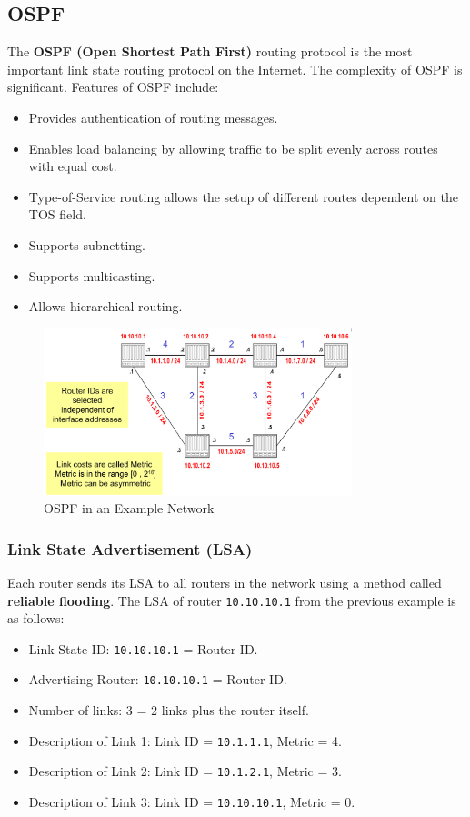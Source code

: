 \documentclass[a4paper,11pt]{article}
\begin{document}
\subsection{OSPF}
The \textbf{OSPF (Open Shortest Path First)} routing protocol is the most important link state routing protocol on 
the Internet. 
The complexity of OSPF is significant.
Features of OSPF include:
\begin{itemize}
    \item   Provides authentication of routing messages.
    \item   Enables load balancing by allowing traffic to be split evenly across routes with equal cost.
    \item   Type-of-Service routing allows the setup of different routes dependent on the TOS field.
    \item   Supports subnetting.
    \item   Supports multicasting.
    \item   Allows hierarchical routing.
\end{itemize}

\begin{figure}[H]
    \centering
    \includegraphics[width=0.8\textwidth]{./images/ospf_example.png}
    \caption{OSPF in an Example Network}
\end{figure}

\subsubsection{Link State Advertisement (LSA)}
Each router sends its LSA to all routers in the network using a method called \textbf{reliable flooding}.
The LSA of router  \verb|10.10.10.1| from the previous example is as follows:
\begin{itemize}
    \item   Link State ID: \verb|10.10.10.1| = Router ID.
    \item   Advertising Router: \verb|10.10.10.1| = Router ID.
    \item   Number of links: 3 = 2 links plus the router itself.
    \item   Description of Link 1: Link ID = \verb|10.1.1.1|, Metric = 4.
    \item   Description of Link 2: Link ID = \verb|10.1.2.1|, Metric = 3.
    \item   Description of Link 3: Link ID = \verb|10.10.10.1|, Metric = 0.
\end{itemize}
\end{document}

